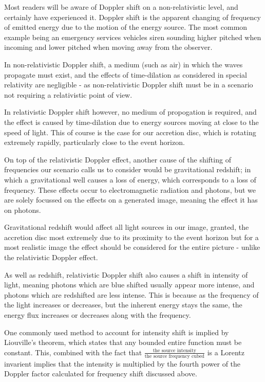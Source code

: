 \documentclass[oneside,openright,frontopenright, singlespacing]{dmathesis}
\begin{document}
	Most readers will be aware of Doppler shift on a non-relativistic level, and certainly have experienced it. Doppler shift is the apparent changing of frequency of emitted energy due to the motion of the energy source. The most common example being an emergency services vehicles siren sounding higher pitched when incoming and lower pitched when moving away from the observer.

\vspace{1em}
	In non-relativistic Doppler shift, a medium (such as air) in which the waves propagate must exist, and the effects of time-dilation as considered in special relativity are negligible - as non-relativistic Doppler shift must be in a scenario not requiring a relativistic point of view.

\vspace{1em}
	In relativistic Doppler shift however, no medium of propogation is required, and the effect is caused by time-dilation due to energy sources moving at close to the speed of light. This of course is the case for our accretion disc, which is rotating extremely rapidly, particularly close to the event horizon.

\vspace{1em}
	On top of the relativistic Doppler effect, another cause of the shifting of frequencies our scenario calls us to consider would be gravitational redshift; in which a gravitational well causes a loss of energy, which corresponds to a loss of frequency. These effects occur to electromagnetic radiation and photons, but we are solely focussed on the effects on a generated image, meaning the effect it has on photons.

\vspace{1em}
	Gravitational redshift would affect all light sources in our image, granted, the accretion disc most extremely due to its proximity to the event horizon but for a most realistic image the effect should be considered for the entire picture - unlike the relativistic Doppler effect.

\vspace{1em}
	As well as redshift, relativistic Doppler shift also causes a shift in intensity of light, meaning photons which are blue shifted usually appear more intense, and photons which are redshifted are less intense. This is because as the frequency of the light increases or decreases, but the inherent energy stays the same, the energy flux increases or decreases along with the frequency. 

\vspace{1em}
	One commonly used method to account for intensity shift is implied by Liouville's theorem, which states that any bounded entire function must be constant. This, combined with the fact that $\frac{\mbox{the source intensity}}{\mbox{the source frequency cubed}}$ is a Lorentz invarient implies that the intensity is multiplied by the fourth power of the Doppler factor calculated for frequency shift discussed above.
\end{document}
